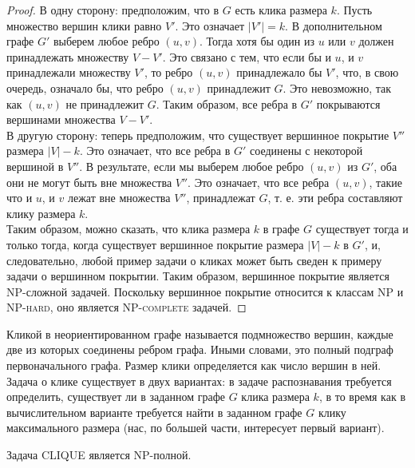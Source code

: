 \begin{proof}
        В одну сторону: предположим, что в $G$ есть клика размера $k$. Пусть множество вершин клики равно $V'$. Это означает $|V'| = k$. В дополнительном графе $G'$ выберем любое ребро $(u, v)$. Тогда хотя бы один из $u$ или $v$ должен принадлежать множеству $V - V'$. Это связано с тем, что если бы и $u$, и $v$ принадлежали множеству $V'$, то ребро $(u, v)$ принадлежало бы $V'$, что, в свою очередь, означало бы, что ребро $(u, v)$ принадлежит $G$. Это невозможно, так как $(u, v)$ не принадлежит $G$. Таким образом, все ребра в $G'$ покрываются вершинами множества $V - V'$.\\
        В другую сторону: теперь предположим, что существует вершинное покрытие $V''$ размера $|V| - k$. Это означает, что все ребра в $G'$ соединены с некоторой вершиной в $V''$. В результате, если мы выберем любое ребро $(u, v)$ из  $G'$, оба они не могут быть вне множества $V''$. Это означает, что все
        ребра $(u, v)$, такие что и $u$, и $v$ лежат вне множества $V''$, принадлежат $G$, т. е. эти ребра составляют клику размера $k$.\\
        Таким образом, можно сказать, что клика размера $k$ в графе $G$ существует тогда и только тогда, когда существует вершинное покрытие размера $|V| - k$ в $G'$, и, следовательно, любой пример задачи о кликах может быть сведен к примеру задачи о вершинном покрытии. Таким образом, вершинное покрытие является \textsc{NP}-сложной задачей. Поскольку вершинное покрытие относится к классам \textsc{NP} и \textsc{NP-hard}, оно является \textsc{NP-complete} задачей.
    \end{proof}
    \begin{Def}
        Кликой в неориентированном графе называется подмножество вершин, каждые две из которых соединены ребром графа. Иными словами, это полный подграф первоначального графа. Размер клики определяется как число вершин в ней. Задача о клике существует в двух вариантах: в задаче распознавания требуется определить, существует ли в заданном графе $G$ клика размера $k$, в то время как в вычислительном варианте требуется найти в заданном графе $G$ клику максимального размера (нас, по большей части, интересует первый вариант).
    \end{Def}
    \begin{Thm}
        Задача \textsc{CLIQUE} является \textsc{NP}-полной.
    \end{Thm}
